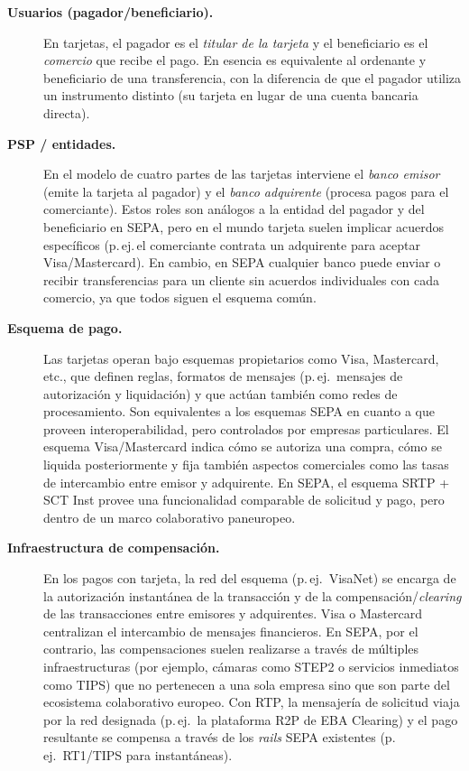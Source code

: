 \begin{description}
  \item[\textbf{Usuarios (pagador/beneficiario).}]
    En tarjetas, el pagador es el \emph{titular de la tarjeta} y el beneficiario es el \emph{comercio} que recibe el pago. En esencia es equivalente al ordenante y beneficiario de una transferencia, con la diferencia de que el pagador utiliza un instrumento distinto (su tarjeta en lugar de una cuenta bancaria directa).

  \item[\textbf{PSP / entidades.}]
    En el modelo de cuatro partes de las tarjetas interviene el \emph{banco emisor} (emite la tarjeta al pagador) y el \emph{banco adquirente} (procesa pagos para el comerciante). Estos roles son análogos a la entidad del pagador y del beneficiario en SEPA, pero en el mundo tarjeta suelen implicar acuerdos específicos (p.\,ej.\,el comerciante contrata un adquirente para aceptar Visa/Mastercard). En cambio, en SEPA cualquier banco puede enviar o recibir transferencias para un cliente sin acuerdos individuales con cada comercio, ya que todos siguen el esquema común.

  \item[\textbf{Esquema de pago.}]
    Las tarjetas operan bajo esquemas propietarios como Visa, Mastercard, etc., que definen reglas, formatos de mensajes (p.\,ej.\ mensajes de autorización y liquidación) y que actúan también como redes de procesamiento. Son equivalentes a los esquemas SEPA en cuanto a que proveen interoperabilidad, pero controlados por empresas particulares. El esquema Visa/Mastercard indica cómo se autoriza una compra, cómo se liquida posteriormente y fija también aspectos comerciales como las tasas de intercambio entre emisor y adquirente. En SEPA, el esquema SRTP + SCT Inst provee una funcionalidad comparable de solicitud y pago, pero dentro de un marco colaborativo paneuropeo.
  \item[\textbf{Infraestructura de compensación.}]
    En los pagos con tarjeta, la red del esquema (p.\,ej.\ VisaNet) se encarga de la autorización instantánea de la transacción y de la compensación/\textit{clearing} de las transacciones entre emisores y adquirentes. Visa o Mastercard centralizan el intercambio de mensajes financieros. En SEPA, por el contrario, las compensaciones suelen realizarse a través de múltiples infraestructuras (por ejemplo, cámaras como STEP2 o servicios inmediatos como TIPS) que no pertenecen a una sola empresa sino que son parte del ecosistema colaborativo europeo. Con RTP, la mensajería de solicitud viaja por la red designada (p.\,ej.\ la plataforma R2P de EBA Clearing) y el pago resultante se compensa a través de los \emph{rails} SEPA existentes (p.\,ej.\ RT1/TIPS para instantáneas).


\end{description}
